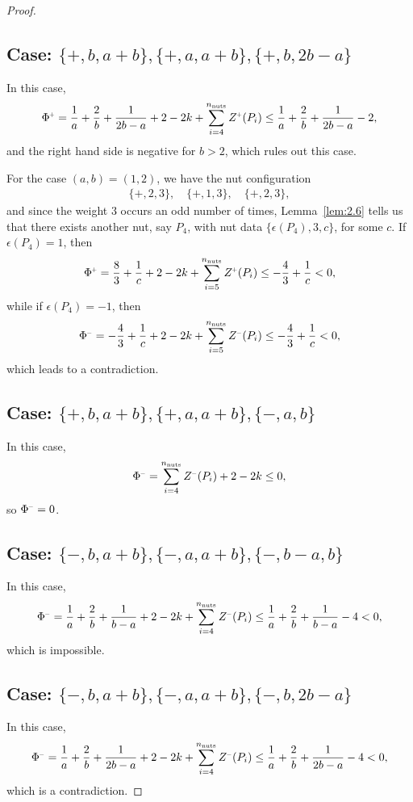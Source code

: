 \documentclass[a4paper,10pt,reqno]{amsart}
\newcommand{\nut}{P}
\theoremstyle{plain}
\newcommand{\nnuts}{n_{\text{\rm nuts}}}
\renewcommand{\P}[1]{{{#1}^{\hspace{-.5pt}\scaleto{+}{4pt}}}}
\newcommand{\M}[1]{{{#1}^{\hspace{-.5pt}\scaleto{-}{4pt}}}}
\numberwithin{equation}{section}
\begin{document}
\begin{proof}
\subsection*{Case: $\{+,b,a+b\}, \{+,a,a+b\},\{+,b,2b-a\}$}
In this case, 
\begin{align}
\P{\Phi}
=\frac{1}{a}+\frac{2}{b}+\frac{1}{2b-a} +2-2k +\sum_{i=4}^{\nnuts}\P{Z}(\nut_i)
\leq\frac{1}{a}+\frac{2}{b}+\frac{1}{2b-a}-2,
\end{align} 
and the right hand side is negative for $b>2$, which rules out this case.

For the case $(a,b)=(1,2)$, we have the nut configuration 
\begin{align} 
\{+,2,3\}, \quad \{+,1,3\}, \quad \{+,2,3\}, 
\end{align} 
and since the weight $3$ occurs an odd number of times, Lemma~\ref{lem:2.6} tells us that there exists another nut, say $\nut_4$, with nut data $\{\epsilon(\nut_4),3,c\}$, for some $c$. If $\epsilon(\nut_4)=1$, then
\begin{align}
\P{\Phi}
=
\frac{8}{3}+\frac{1}{c} +2-2k +\sum_{i=5}^{\nnuts}\P{Z}(\nut_i)
\leq -\frac{4}{3}+\frac{1}{c}
< 0,
\end{align} 
while if $\epsilon(\nut_4)=-1$, then 
\begin{align}
\M{\Phi}
=
-\frac{4}{3}+\frac{1}{c} +2-2k +\sum_{i=5}^{\nnuts}\M{Z}(\nut_i)
\leq -\frac{4}{3}+\frac{1}{c}
< 0,
\end{align}
which leads to a contradiction.

\subsection*{Case: $\{+,b,a+b\},\{+,a,a+b\},\{-,a,b\}$}
In this case, 
\begin{align}
\M{\Phi}
=\sum_{i=4}^{\nnuts}\M{Z}(\nut_i)+2-2k
\leq 0,
\end{align}
so $\M{\Phi} = 0$.

\subsection*{Case: $\{-,b,a+b\},\{-,a,a+b\},\{-,b-a,b\}$}
In this case, 
\begin{align}
\M{\Phi}
=
\frac{1}{a}+\frac{2}{b}+\frac{1}{b-a} +2-2k +\sum_{i=4}^{\nnuts}\M{Z}(\nut_i)
\leq \frac{1}{a}+\frac{2}{b}+\frac{1}{b-a}-4
< 0,
\end{align}
which is impossible.

\subsection*{Case: $\{-,b,a+b\},\{-,a,a+b\},\{-,b,2b-a\}$}
In this case, 
\begin{align}
\M{\Phi}
= \frac{1}{a}+\frac{2}{b}+\frac{1}{2b-a}
+2-2k+\sum_{i=4}^{\nnuts}\M{Z}(\nut_i)
\leq \frac{1}{a}+\frac{2}{b}+\frac{1}{2b-a}-4
<0,
\end{align}
which is a contradiction.


\end{proof}
\end{document}
